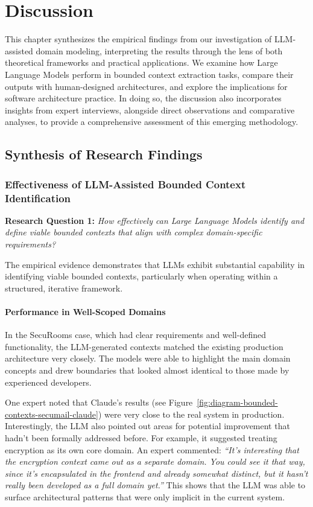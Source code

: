 \chapter{Discussion}\label{chapter:discussion}

This chapter synthesizes the empirical findings from our investigation of LLM-assisted domain modeling, interpreting the results through the lens of both theoretical frameworks and practical applications. We examine how Large Language Models perform in bounded context extraction tasks, compare their outputs with human-designed architectures, and explore the implications for software architecture practice. In doing so, the discussion also incorporates insights from expert interviews, alongside direct observations and comparative analyses, to provide a comprehensive assessment of this emerging methodology.

\section{Synthesis of Research Findings}

\subsection{Effectiveness of LLM-Assisted Bounded Context Identification}

\textbf{Research Question 1:} \textit{How effectively can Large Language Models identify and define viable bounded contexts that align with complex domain-specific requirements?}

The empirical evidence demonstrates that LLMs exhibit substantial capability in identifying viable bounded contexts, particularly when operating within a structured, iterative framework.

\subsubsection{Performance in Well-Scoped Domains}
In the SecuRooms case, which had clear requirements and well-defined functionality, the LLM-generated contexts matched the existing production architecture very closely. The models were able to highlight the main domain concepts and drew boundaries that looked almost identical to those made by experienced developers.

One expert noted that Claude's results (see Figure~\ref{fig:diagram-bounded-contexts-secumail-claude}) were very close to the real system in production. Interestingly, the LLM also pointed out areas for potential improvement that hadn't been formally addressed before. For example, it suggested treating encryption as its own core domain. An expert commented: \textit{“It's interesting that the encryption context came out as a separate domain. You could see it that way, since it's encapsulated in the frontend and already somewhat distinct, but it hasn't really been developed as a full domain yet.”} This shows that the LLM was able to surface architectural patterns that were only implicit in the current system.

